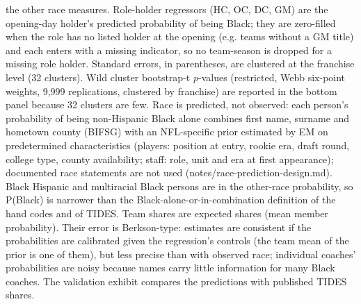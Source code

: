 {the other race measures. Role-holder regressors (HC, OC, DC, GM) are the opening-day holder's predicted probability of being Black; they are zero-filled when the role has no listed holder at the opening (e.g. teams without a GM title) and each enters with a missing indicator, so no team-season is dropped for a missing role holder. Standard errors, in parentheses, are clustered at the franchise level (32 clusters). Wild cluster bootstrap-t $p$-values (restricted, Webb six-point weights, 9,999 replications, clustered by franchise) are reported in the bottom panel because 32 clusters are few. Race is predicted, not observed: each person's probability of being non-Hispanic Black alone combines first name, surname and hometown county (BIFSG) with an NFL-specific prior estimated by EM on predetermined characteristics (players: position at entry, rookie era, draft round, college type, county availability; staff: role, unit and era at first appearance); documented race statements are not used (notes/race-prediction-design.md). Black Hispanic and multiracial Black persons are in the other-race probability, so P(Black) is narrower than the Black-alone-or-in-combination definition of the hand codes and of TIDES. Team shares are expected shares (mean member probability). Their error is Berkson-type: estimates are consistent if the probabilities are calibrated given the regression's controls (the team mean of the prior is one of them), but less precise than with observed race; individual coaches' probabilities are noisy because names carry little information for many Black coaches. The validation exhibit compares the predictions with published TIDES shares.
\par}

